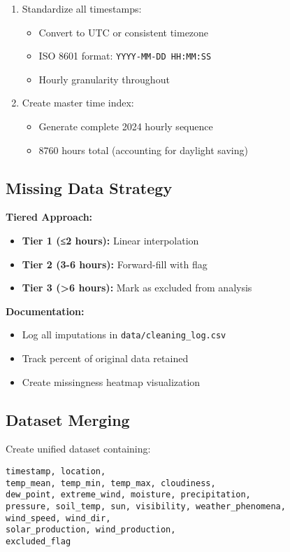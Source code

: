 \documentclass[11pt,a4paper]{article}
\begin{document}
\begin{enumerate}
    \item Standardize all timestamps:
    \begin{itemize}
        \item Convert to UTC or consistent timezone
        \item ISO 8601 format: \texttt{YYYY-MM-DD HH:MM:SS}
        \item Hourly granularity throughout
    \end{itemize}
    
    \item Create master time index:
    \begin{itemize}
        \item Generate complete 2024 hourly sequence
        \item 8760 hours total (accounting for daylight saving)
    \end{itemize}
\end{enumerate}

\subsection{Missing Data Strategy}

\textbf{Tiered Approach:}
\begin{itemize}
    \item \textbf{Tier 1 (≤2 hours):} Linear interpolation
    \item \textbf{Tier 2 (3-6 hours):} Forward-fill with flag
    \item \textbf{Tier 3 (>6 hours):} Mark as excluded from analysis
\end{itemize}

\textbf{Documentation:}
\begin{itemize}
    \item Log all imputations in \texttt{data/cleaning\_log.csv}
    \item Track percent of original data retained
    \item Create missingness heatmap visualization
\end{itemize}

\subsection{Dataset Merging}

Create unified dataset containing:
\begin{verbatim}
timestamp, location, 
temp_mean, temp_min, temp_max, cloudiness,
dew_point, extreme_wind, moisture, precipitation,
pressure, soil_temp, sun, visibility, weather_phenomena,
wind_speed, wind_dir,
solar_production, wind_production,
excluded_flag
\end{verbatim}
\end{document}
